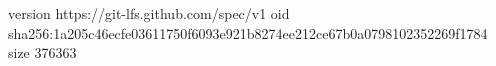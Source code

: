 version https://git-lfs.github.com/spec/v1
oid sha256:1a205c46ecfe03611750f6093e921b8274ee212ce67b0a0798102352269f1784
size 376363
